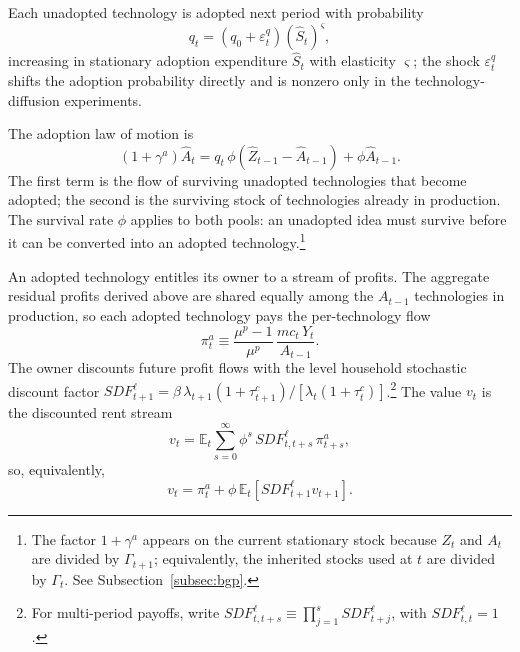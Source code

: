 \documentclass[a4paper,11pt]{article}
\begin{document}
Each unadopted technology is adopted next period with probability
\begin{equation}
    q_t = \left(q_0 + \varepsilon_t^{q}\right)\left(\hat{S}_t\right)^{\varsigma}, \label{eq:probadopt}
\end{equation}
increasing in stationary adoption expenditure $\hat{S}_t$ with elasticity $\varsigma$; the shock $\varepsilon_t^{q}$ shifts the adoption probability directly and is nonzero only in the technology-diffusion experiments.

The adoption law of motion is
\begin{equation}
    \left(1+\gamma^{a}\right) \hat{A}_{t} = q_t\, \phi\left(\hat{Z}_{t-1} - \hat{A}_{t-1}\right) + \phi \hat{A}_{t-1}. \label{eq:Astat}
\end{equation}
The first term is the flow of surviving unadopted technologies that become adopted; the second is the surviving stock of technologies already in production.
The survival rate $\phi$ applies to both pools: an unadopted idea must survive before it can be converted into an adopted technology.\footnote{The factor $1+\gamma^{a}$ appears on the current stationary stock because $Z_t$ and $A_t$ are divided by $\Gamma_{t+1}$; equivalently, the inherited stocks used at $t$ are divided by $\Gamma_t$.
See Subsection~\ref{subsec:bgp}.}

An adopted technology entitles its owner to a stream of profits.
The aggregate residual profits derived above are shared equally among the $A_{t-1}$ technologies in production, so each adopted technology pays the per-technology flow
\[
    \pi_t^{a} \equiv \frac{\mu^{p}-1}{\mu^{p}}\, \frac{mc_t\, Y_t}{A_{t-1}}.
\]
The owner discounts future profit flows with the level household stochastic discount factor $\mathit{SDF}^{\ell}_{t+1} = \beta\, \lambda_{t+1}\left(1+\tau_{t+1}^{c}\right)/[\lambda_t\left(1+\tau_t^{c}\right)]$.\footnote{For multi-period payoffs, write $\mathit{SDF}^{\ell}_{t,t+s}\equiv\prod_{j=1}^{s}\mathit{SDF}^{\ell}_{t+j}$, with $\mathit{SDF}^{\ell}_{t,t}=1$.}
The value $v_t$ is the discounted rent stream
\[
    v_t = \mathbb{E}_t \sum_{s=0}^{\infty} \phi^{s}\,\mathit{SDF}^{\ell}_{t,t+s}\,\pi_{t+s}^{a},
\]
so, equivalently,
\[
    v_t = \pi_t^{a} + \phi\,\mathbb{E}_t[\mathit{SDF}^{\ell}_{t+1}v_{t+1}].
\]
\end{document}
